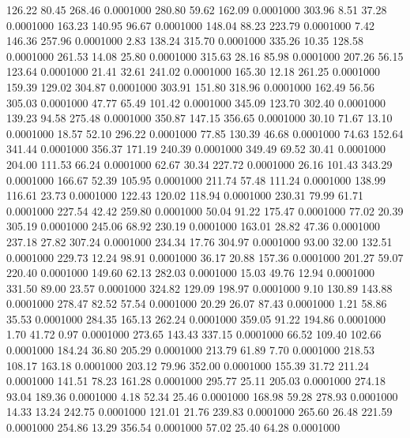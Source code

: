  126.22   80.45  268.46   0.0001000
 280.80   59.62  162.09   0.0001000
 303.96    8.51   37.28   0.0001000
 163.23  140.95   96.67   0.0001000
 148.04   88.23  223.79   0.0001000
   7.42  146.36  257.96   0.0001000
   2.83  138.24  315.70   0.0001000
 335.26   10.35  128.58   0.0001000
 261.53   14.08   25.80   0.0001000
 315.63   28.16   85.98   0.0001000
 207.26   56.15  123.64   0.0001000
  21.41   32.61  241.02   0.0001000
 165.30   12.18  261.25   0.0001000
 159.39  129.02  304.87   0.0001000
 303.91  151.80  318.96   0.0001000
 162.49   56.56  305.03   0.0001000
  47.77   65.49  101.42   0.0001000
 345.09  123.70  302.40   0.0001000
 139.23   94.58  275.48   0.0001000
 350.87  147.15  356.65   0.0001000
  30.10   71.67   13.10   0.0001000
  18.57   52.10  296.22   0.0001000
  77.85  130.39   46.68   0.0001000
  74.63  152.64  341.44   0.0001000
 356.37  171.19  240.39   0.0001000
 349.49   69.52   30.41   0.0001000
 204.00  111.53   66.24   0.0001000
  62.67   30.34  227.72   0.0001000
  26.16  101.43  343.29   0.0001000
 166.67   52.39  105.95   0.0001000
 211.74   57.48  111.24   0.0001000
 138.99  116.61   23.73   0.0001000
 122.43  120.02  118.94   0.0001000
 230.31   79.99   61.71   0.0001000
 227.54   42.42  259.80   0.0001000
  50.04   91.22  175.47   0.0001000
  77.02   20.39  305.19   0.0001000
 245.06   68.92  230.19   0.0001000
 163.01   28.82   47.36   0.0001000
 237.18   27.82  307.24   0.0001000
 234.34   17.76  304.97   0.0001000
  93.00   32.00  132.51   0.0001000
 229.73   12.24   98.91   0.0001000
  36.17   20.88  157.36   0.0001000
 201.27   59.07  220.40   0.0001000
 149.60   62.13  282.03   0.0001000
  15.03   49.76   12.94   0.0001000
 331.50   89.00   23.57   0.0001000
 324.82  129.09  198.97   0.0001000
   9.10  130.89  143.88   0.0001000
 278.47   82.52   57.54   0.0001000
  20.29   26.07   87.43   0.0001000
   1.21   58.86   35.53   0.0001000
 284.35  165.13  262.24   0.0001000
 359.05   91.22  194.86   0.0001000
   1.70   41.72    0.97   0.0001000
 273.65  143.43  337.15   0.0001000
  66.52  109.40  102.66   0.0001000
 184.24   36.80  205.29   0.0001000
 213.79   61.89    7.70   0.0001000
 218.53  108.17  163.18   0.0001000
 203.12   79.96  352.00   0.0001000
 155.39   31.72  211.24   0.0001000
 141.51   78.23  161.28   0.0001000
 295.77   25.11  205.03   0.0001000
 274.18   93.04  189.36   0.0001000
   4.18   52.34   25.46   0.0001000
 168.98   59.28  278.93   0.0001000
  14.33   13.24  242.75   0.0001000
 121.01   21.76  239.83   0.0001000
 265.60   26.48  221.59   0.0001000
 254.86   13.29  356.54   0.0001000
  57.02   25.40   64.28   0.0001000
